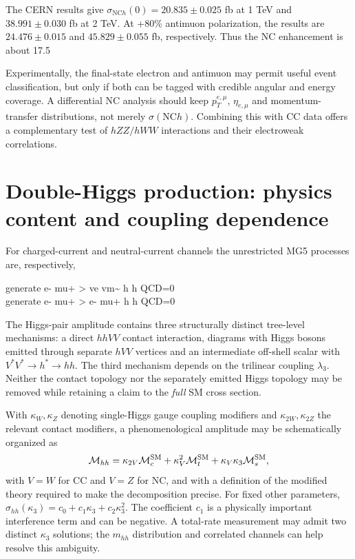 \documentclass[12pt,a4paper]{article}
\newcommand{\newnote}{\clearpage}
\newcommand{\NC}{\mathrm{NC}}
\begin{document}
The CERN results give $\sigma_{\NC h}(0)=20.835\pm0.025$ fb at 1 TeV and $38.991\pm0.030$ fb at 2 TeV. At +80\% antimuon polarization, the results are $24.476\pm0.015$ and $45.829\pm0.055$ fb, respectively. Thus the NC enhancement is about 17.5%

Experimentally, the final-state electron and antimuon may permit useful event classification, but only if both can be tagged with credible angular and energy coverage. A differential NC analysis should keep $p_T^{e,\mu}$, $\eta_{e,\mu}$ and momentum-transfer distributions, not merely $\sigma(\NC h)$. Combining this with CC data offers a complementary test of $hZZ/hWW$ interactions and their electroweak correlations.




\newnote

\section{Double-Higgs production: physics content and coupling dependence}
For charged-current and neutral-current channels the unrestricted MG5 processes are, respectively,
\begin{center}\ttfamily\small
 generate e- mu+ > ve vm\textasciitilde{} h h QCD=0\\
 generate e- mu+ > e- mu+ h h QCD=0
\end{center}
The Higgs-pair amplitude contains three structurally distinct tree-level mechanisms: a direct $hhVV$ contact interaction, diagrams with Higgs bosons emitted through separate $hVV$ vertices and an intermediate off-shell scalar with $V^*V^*\to h^*\to hh$. The third mechanism depends on the trilinear coupling $\lambda_3$. Neither the contact topology nor the separately emitted Higgs topology may be removed while retaining a claim to the \emph{full} SM cross section.

With $\kappa_W,\kappa_Z$ denoting single-Higgs gauge coupling modifiers and $\kappa_{2W},\kappa_{2Z}$ the relevant contact modifiers, a phenomenological amplitude may be schematically organized as
\begin{equation}\label{eq:hhamp}
\mathcal M_{hh}=\kappa_{2V}\mathcal M_c^{\rm SM}
+\kappa_V^2\mathcal M_t^{\rm SM}
+\kappa_V\kappa_3\mathcal M_s^{\rm SM},
\end{equation}
with $V=W$ for CC and $V=Z$ for NC, and with a definition of the modified theory required to make the decomposition precise. For fixed other parameters, $\sigma_{hh}(\kappa_3)=c_0+c_1\kappa_3+c_2\kappa_3^2$. The coefficient $c_1$ is a physically important interference term and can be negative. A total-rate measurement may admit two distinct $\kappa_3$ solutions; the $m_{hh}$ distribution and correlated channels can help resolve this ambiguity.
\end{document}

